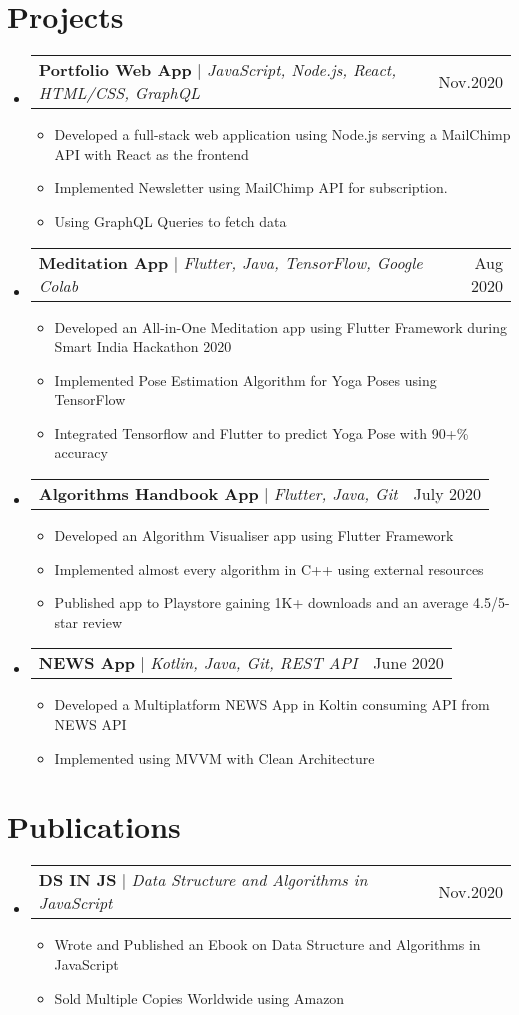 \documentclass[letterpaper,11pt]{article}
\makeatletter
\newcommand{\resumeItem}[1]{
  \item\small{
    {#1 \vspace{-2pt}}
  }
}
\newcommand{\resumeProjectHeading}[2]{
    \item
    \begin{tabular*}{0.97\textwidth}{l@{\extracolsep{\fill}}r}
      \small#1 & #2 \\
    \end{tabular*}\vspace{-7pt}
}
\newcommand{\resumeSubHeadingListStart}{\begin{itemize}[leftmargin=0.15in, label={}]}
\newcommand{\resumeSubHeadingListEnd}{\end{itemize}}
\newcommand{\resumeItemListStart}{\begin{itemize}}
\newcommand{\resumeItemListEnd}{\end{itemize}\vspace{-5pt}}
\makeatother
\begin{document}
\section{Projects}
    \resumeSubHeadingListStart
      \resumeProjectHeading
          {\textbf{Portfolio Web App} $|$ \emph{JavaScript, Node.js, React, HTML/CSS, GraphQL}}{Nov.2020}
          \resumeItemListStart
            \resumeItem{Developed a full-stack web application using Node.js serving a MailChimp API with React as the frontend}
            \resumeItem{Implemented Newsletter using MailChimp API for subscription.}
            \resumeItem{Using GraphQL Queries to fetch data}
          \resumeItemListEnd
     \resumeProjectHeading
          {\textbf{Meditation App} $|$ \emph{Flutter, Java, TensorFlow, Google Colab}}{Aug 2020}
          \resumeItemListStart
            \resumeItem{Developed an All-in-One Meditation app using Flutter Framework during Smart India Hackathon 2020}
            \resumeItem{Implemented Pose Estimation Algorithm for Yoga Poses using TensorFlow}
            \resumeItem{Integrated Tensorflow and Flutter to predict Yoga Pose with 90+\% accuracy}
          \resumeItemListEnd
      \resumeProjectHeading
          {\textbf{Algorithms Handbook App} $|$ \emph{Flutter, Java, Git}}{July 2020}
          \resumeItemListStart
            \resumeItem{Developed an Algorithm Visualiser app using Flutter Framework}
            \resumeItem{Implemented almost every algorithm in C++ using external resources }
            \resumeItem{Published app to Playstore gaining 1K+ downloads and an average 4.5/5-star review}
          \resumeItemListEnd
     \resumeProjectHeading
          {\textbf{NEWS App} $|$ \emph{Kotlin, Java, Git, REST API}}{June 2020}
          \resumeItemListStart
            \resumeItem{Developed a Multiplatform NEWS App in Koltin consuming API from NEWS API}
            \resumeItem{Implemented using MVVM with Clean Architecture}
          \resumeItemListEnd
    \resumeSubHeadingListEnd

\section{Publications}
    \resumeSubHeadingListStart
      \resumeProjectHeading
          {\textbf{DS IN JS} $|$ \emph{Data Structure and Algorithms in JavaScript}}{Nov.2020}
          \resumeItemListStart
            \resumeItem{Wrote and Published an Ebook on Data Structure and Algorithms in JavaScript}
            \resumeItem{Sold Multiple Copies Worldwide using Amazon}
          \resumeItemListEnd
            \resumeSubHeadingListEnd
\end{document}
